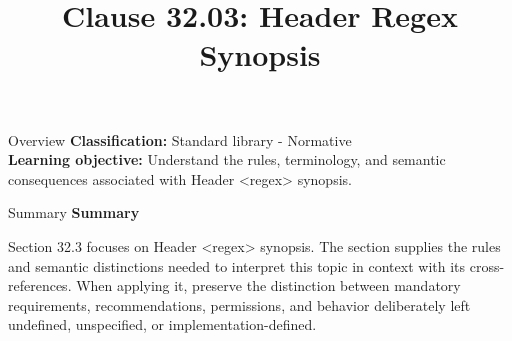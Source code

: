 \documentclass[10pt,letterpaper]{article}
\title{Clause 32.03: Header Regex Synopsis}
\author{}
\date{}
\begin{document}
\maketitle
\begin{CornellOverviewBox}{Overview}
\textbf{Classification:} Standard library - Normative\\[2pt]
\textbf{Learning objective:} Understand the rules, terminology, and semantic consequences associated with Header <regex> synopsis.
\end{CornellOverviewBox}\begin{CornellSummaryBox}{Summary}
{\sffamily\bfseries\color{Accent} Summary}\par\vspace{3pt}Section 32.3 focuses on Header <regex> synopsis. The section supplies the rules and semantic distinctions needed to interpret this topic in context with its cross-references. When applying it, preserve the distinction between mandatory requirements, recommendations, permissions, and behavior deliberately left undefined, unspecified, or implementation-defined.
\end{CornellSummaryBox}
\end{document}
